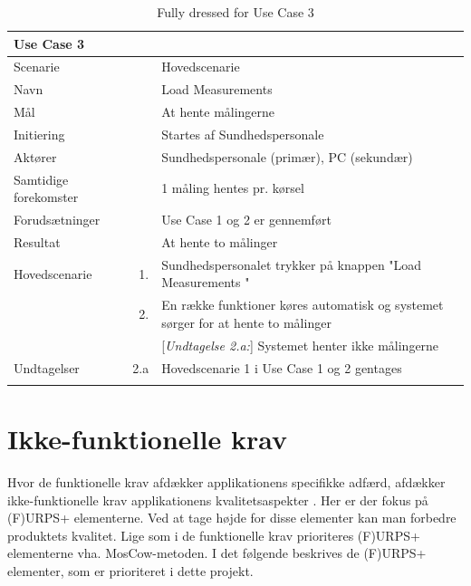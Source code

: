 \begin{longtabu} to  %
	{\large \textbf{Use Case 3 }} && \\
	\toprule
	Scenarie 				&&	Hovedscenarie\\
	Navn 					&& 	Load Measurements\\
	Mål 					&& 	At hente målingerne  \\
	Initiering 				&& 	Startes af Sundhedspersonale\\
	Aktører 				&& 	Sundhedspersonale (primær), PC (sekundær)\\

	Samtidige forekomster  	&& 	1 måling hentes pr. kørsel  \\
	Forudsætninger 			&&	Use Case 1 og 2 er gennemført \\ 
	Resultat 				&& At hente to målinger \\ \midrule
	Hovedscenarie 			&    1. 	&	Sundhedspersonalet trykker på knappen "Load Measurements "\\				 	
							&    2. 	& 	En række funktioner køres automatisk og systemet sørger for at hente to målinger\\
							
	&&[\textit{Undtagelse 2.a:}] Systemet henter ikke målingerne\\ \midrule							
							
	Undtagelser 			&		2.a	& 	Hovedscenarie 1 i Use Case 1 og 2 gentages  \\ \bottomrule
	
	\caption{Fully dressed for Use Case 3}
	\label{UC2}
\end{longtabu}



\pagebreak



\section{Ikke-funktionelle krav}
Hvor de funktionelle krav afdækker applikationens specifikke adfærd, afdækker ikke-funktionelle krav applikationens kvalitetsaspekter  \cite{ISELektioner}. Her er der fokus på (F)URPS+ elementerne. Ved at tage højde for disse elementer kan man forbedre produktets kvalitet. Lige som i de funktionelle krav prioriteres (F)URPS+ elementerne vha. MosCow-metoden. I det følgende beskrives de (F)URPS+ elementer, som er prioriteret i dette projekt.  



